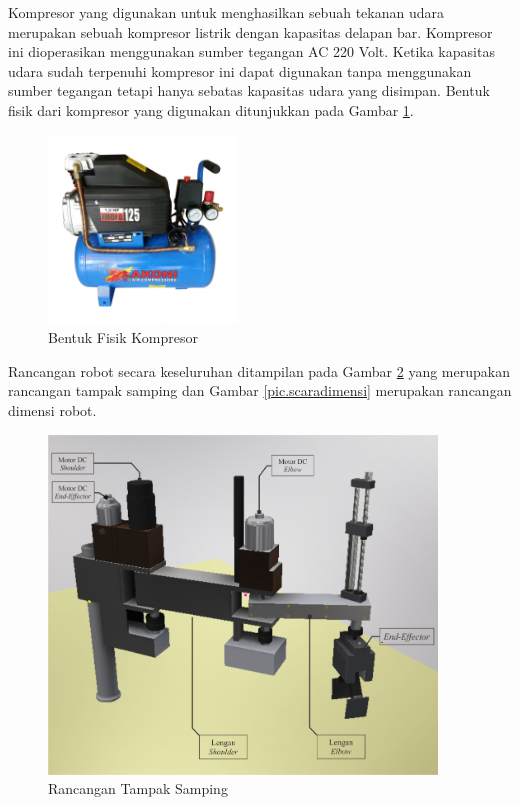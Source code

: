 Kompresor yang digunakan untuk menghasilkan sebuah tekanan udara merupakan sebuah kompresor listrik dengan kapasitas delapan bar. Kompresor ini dioperasikan menggunakan sumber tegangan AC 220 Volt. Ketika kapasitas udara sudah terpenuhi kompresor ini dapat digunakan tanpa menggunakan sumber tegangan tetapi hanya sebatas kapasitas udara yang disimpan. Bentuk fisik dari kompresor yang digunakan ditunjukkan pada Gambar \ref{pic.kompresor}.
\begin{figure}[H]
	\centering
	\includegraphics[height=5cm]{gambar/kompresor.png}
	\caption{Bentuk Fisik Kompresor}
	\label{pic.kompresor}
\end{figure}

Rancangan robot secara keseluruhan ditampilan pada Gambar \ref{pic.scarasamping} yang merupakan rancangan tampak samping dan Gambar \ref{pic.scaradimensi} merupakan rancangan dimensi robot. 
\begin{figure}[H]
	\centering
	\includegraphics[height=9cm]{gambar/samping.png}
	\caption{Rancangan Tampak Samping}
	\label{pic.scarasamping}
\end{figure}

